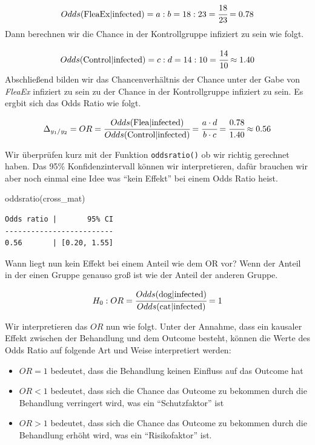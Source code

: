 \documentclass[
  letterpaper,
]{scrbook}
\newenvironment{Shaded}{\begin{snugshade}}{\end{snugshade}}
\newcommand{\FunctionTok}[1]{\textcolor[rgb]{0.28,0.35,0.67}{#1}}
\newcommand{\NormalTok}[1]{\textcolor[rgb]{0.00,0.23,0.31}{#1}}
\providecommand{\tightlist}{%
  \setlength{\itemsep}{0pt}\setlength{\parskip}{0pt}}\usepackage{longtable,booktabs,array}
\begin{document}
\[
Odds(\mbox{FleaEx}|\mbox{infected}) = a:b = 18:23 = \cfrac{18}{23} = 0.78
\] Dann berechnen wir die Chance in der Kontrollgruppe infiziert zu sein
wie folgt.

\[
Odds(\mbox{Control}|\mbox{infected}) = c:d = 14:10 = \cfrac{14}{10} \approx 1.40 
\] Abschließend bilden wir das Chancenverhältnis der Chance unter der
Gabe von \emph{FleaEx} infiziert zu sein zu der Chance in der
Kontrollgruppe infiziert zu sein. Es ergbit sich das Odds Ratio wie
folgt.

\[
\Delta_{y_1/y_2} = OR =  \cfrac{Odds(\mbox{Flea}|\mbox{infected})}{Odds(\mbox{Control}|\mbox{infected})} = \cfrac{a \cdot d}{b \cdot c} = \cfrac{0.78}{1.40} \approx 0.56
\]

Wir überprüfen kurz mit der Funktion \texttt{oddsratio()} ob wir richtig
gerechnet haben. Das 95\% Konfidenzintervall können wir interpretieren,
dafür brauchen wir aber noch einmal eine Idee was ``kein Effekt'' bei
einem Odds Ratio heist.

\begin{Shaded}
\begin{Highlighting}[]
\FunctionTok{oddsratio}\NormalTok{(cross\_mat)}
\end{Highlighting}
\end{Shaded}

\begin{verbatim}
Odds ratio |       95% CI
-------------------------
0.56       | [0.20, 1.55]
\end{verbatim}

Wann liegt nun kein Effekt bei einem Anteil wie dem OR vor? Wenn der
Anteil in der einen Gruppe genauso groß ist wie der Anteil der anderen
Gruppe.

\[
H_0: OR =  \cfrac{Odds(\mbox{dog}|\mbox{infected})}{Odds(\mbox{cat}|\mbox{infected})} = 1
\]

Wir interpretieren das \(OR\) nun wie folgt. Unter der Annahme, dass ein
kausaler Effekt zwischen der Behandlung und dem Outcome besteht, können
die Werte des Odds Ratio auf folgende Art und Weise interpretiert
werden:

\begin{itemize}
\tightlist
\item
  \(OR = 1\) bedeutet, dass die Behandlung keinen Einfluss auf das
  Outcome hat
\item
  \(OR < 1\) bedeutet, dass sich die Chance das Outcome zu bekommen
  durch die Behandlung verringert wird, was ein ``Schutzfaktor'' ist
\item
  \(OR > 1\) bedeutet, dass sich die Chance das Outcome zu bekommen
  durch die Behandlung erhöht wird, was ein ``Risikofaktor'' ist.
\end{itemize}
\end{document}
